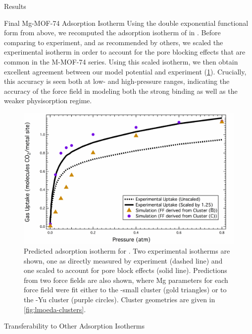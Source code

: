 \begin{section}{Results}
\begin{subsection}{Final Mg-MOF-74 {\co} Adsorption Isotherm}
Using the double exponential functional form from above, we recomputed the
 adsorption isotherm of \co in \mgmof. Before comparing to experiment, and as
recommended by others,\cite{Haldoupis2015a} we scaled the experimental
isotherm in order to account for the pore blocking effects that are common in
the M-MOF-74 series. Using this scaled isotherm, we then obtain excellent
agreement between our model potential and experiment
(\cref{fig:lmoeda-isotherm}). Crucially, this accuracy is seen both at low-
and high-pressure ranges, indicating the accuracy of the force field in
modeling both the
strong  binding as well as the weaker physisorption regime.



    \begin{figure}
    \centering
    \includegraphics[width=1.0\textwidth]{lmoeda/mgmof_isotherm.pdf}
    \caption[Predicted \co Adsorption Isotherm for \mgmof]
{Predicted \co adsorption isotherm for \mgmof. Two experimental isotherms are
shown, one as directly measured by experiment (dashed line) and one scaled to
account for pore block effects (solid line). Predictions from two force fields
are also shown, where Mg parameters for each force field were fit either to
the \mgmof-small cluster (gold triangles) or to the \mgmof-Yu cluster (purple
circles). Cluster geometries are given in \cref{fig:lmoeda-clusters}.
            }
    \label{fig:lmoeda-isotherm}
    \end{figure}

\end{subsection}
\begin{subsection}{Transferability to Other Adsorption Isotherms}


\end{subsection}
\end{section}
